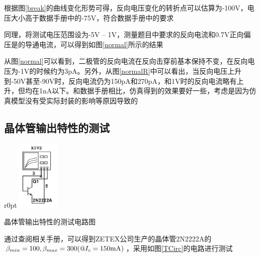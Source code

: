 \documentclass[UTF8,a4paper]{ctexart}
\begin{document}
根据图\ref{break}的曲线变化形势可得，反向电压变化的转折点可以估算为-100V，电压大小高于数据手册中的-75V，符合数据手册中的要求

同理，将测试电压范围设为-5V -- 1V，测量题目中要求的反向电流和0.7V正向偏压是的导通电流，可以得到如图\ref{normal}所示的结果

从图\ref{normal}可以看到，二极管的反向电流在反向击穿前基本保持不变，在反向电压为-1V的时候约为3pA。另外，从图\ref{normalR}中可以看出，当反向电压上升到-50V甚至-90V时，反向电流仍为150pA和270pA，和1V时的反向电流略有上升，但均在1nA以下。和数据手册相比，仿真得到的效果要好一些，考虑是因为仿真模型没有受实际封装的影响等原因导致的 
\subsection{晶体管输出特性的测试}

\begin {wrapfigure}{r}{0pt}
\includegraphics [width=20mm]{cap/9.JPG}
\caption{晶体管输出特性的测试电路图}
\label{TCirc}
\end {wrapfigure}
通过查阅相关手册，可以得到ZETEX公司生产的晶体管2N2222A的$\beta_{min}=100,\beta_{max}=300(@I_c=150\rm{mA})$，采用如图\ref{TCirc}的电路进行测试
\end{document}
